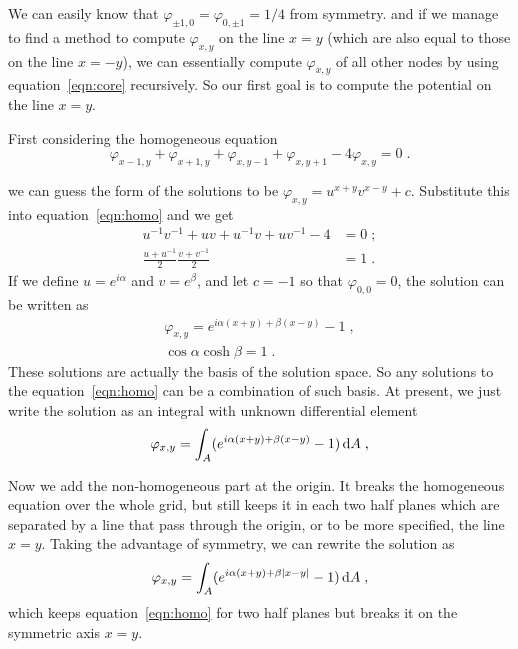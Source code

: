 \documentclass[10pt,a4paper,draft]{article}
\begin{document}
    We can easily know that $\varphi_{\pm1,0}=\varphi_{0,\pm1}=1/4$ from symmetry. and if we manage to find a method to compute $\varphi_{x,y}$ on the line $x=y$ (which are also equal to those on the line $x=-y$), we can essentially compute $\varphi_{x,y}$ of all other nodes by using equation~\eqref{eqn:core} recursively. So our first goal is to compute the potential on the line $x=y$.
	
	
	First considering the homogeneous equation
	\begin{equation}
		\varphi_{x-1,y}+\varphi_{x+1,y}+\varphi_{x,y-1}+\varphi_{x,y+1}-4\varphi_{x,y}=0\;.
		\label{eqn:homo}
	\end{equation}

	we can guess the form of the solutions to be  $\varphi_{x,y}=u^{x+y}v^{x-y} + c$. Substitute this into equation~\eqref{eqn:homo} and we get
	\begin{align*}
	u^{-1}v^{-1}+uv+u^{-1}v+uv^{-1}-4&=0\;;\\
	\frac{u+u^{-1}}{2}\frac{v+v^{-1}}{2}&=1\;.
	\end{align*}
	If we define $u=e^{i\alpha}$ and $v=e^\beta$, and let $c = -1$ so that $\varphi_{0,0}=0$, the solution can be written as
	\begin{eqnarray}
	\varphi_{x,y}=e^{i\alpha(x+y)+\beta(x-y)}-1\;,\\\label{eqn:base}
	\cos\alpha\cosh\beta=1\;.\label{eqn:cons}
	\end{eqnarray}
	These solutions are actually the basis of the solution space. So any solutions to the equation~\eqref{eqn:homo} can be a combination of such basis. At present, we just write the solution as an integral with unknown differential element
	\[
	\varphi_{x,y}=\int_A (e^{i\alpha(x+y)+\beta(x-y)}-1)\,\mathrm{d} A\;,
	\]
	
	Now we add the non-homogeneous part at the origin. It breaks the homogeneous equation over the whole grid, but still keeps it in each two half planes which are separated by a line that pass through the origin, or to be more specified, the line $x=y$. Taking the advantage of symmetry, we can rewrite the solution as
	\[
	\varphi_{x,y}=\int_A (e^{i\alpha(x+y)+\beta|x-y|}-1)\,\mathrm{d} A\;,
	\label{eqn:integ}
	\] 
	which keeps equation~\eqref{eqn:homo} for two half planes but breaks it on the symmetric axis $x=y$.
	
\end{document}
